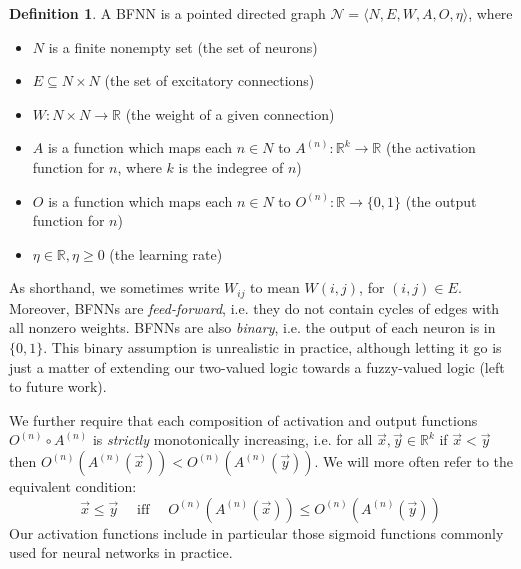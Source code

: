 \documentclass[letterpaper]{article}
\theoremstyle{definition}
\newtheorem{definition}{Definition}
\newcommand{\set}[1]{\{ #1 \}}
\newcommand{\Net}{\mathcal{N}}
\begin{document}
\begin{definition} A BFNN is a pointed directed graph ${\Net = \langle N, E, W, A, O, \eta \rangle}$, where
\begin{itemize}
    \item $N$ is a finite nonempty set (the set of neurons)
    \item $E \subseteq N \times N$ (the set of excitatory connections)
    \item $W : N \times N \to \mathbb{R}$ (the weight of a given connection)
    
    \item $A$ is a function which maps each $n \in N$ to
    $A^{(n)} : \mathbb{R}^k \to \mathbb{R}$ (the activation function for $n$, where $k$ is the indegree of $n$)
    \item $O$ is a function which maps each $n \in N$ to 
    $O^{(n)} : \mathbb{R} \to \set{0, 1}$ (the output function for $n$)
    \item $\eta \in \mathbb{R}, \eta \geq 0$ (the learning rate)
\end{itemize}
As shorthand, we sometimes write $W_{ij}$ to mean $W(i,j)$, for ${(i, j) \in E}$. Moreover, BFNNs are \emph{feed-forward}, i.e. they do not contain cycles of edges with all nonzero weights.  BFNNs are also \emph{binary}, i.e. the output of each neuron is in $\set{0, 1}$.  This binary assumption is unrealistic in practice, although letting it go is just a matter of extending our two-valued logic towards a fuzzy-valued logic (left to future work).

We further require that each composition of activation and output functions ${O^{(n)} \circ A^{(n)}}$ is \textit{strictly} monotonically increasing, i.e. for all $\vec{x}, \vec{y} \in \mathbb{R}^k$ if $\vec{x} < \vec{y}$ then $O^{(n)}(A^{(n)}(\vec{x})) < O^{(n)}(A^{(n)}(\vec{y}))$.  We will more often refer to the equivalent condition:
\begin{equation}\tag{$\ast$}
\label{eqn:increasing}
\vec{x} \leq \vec{y} \quad \mbox{ iff } \quad  O^{(n)}(A^{(n)}(\vec{x})) \leq O^{(n)}(A^{(n)}(\vec{y}))
\end{equation}
Our activation functions include in particular those sigmoid functions commonly used for neural networks in practice.
\end{definition}


\end{document}
